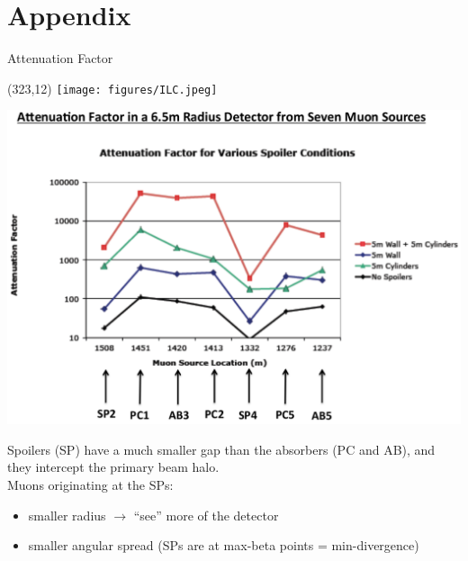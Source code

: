 \documentclass[xcolor={dvipsnames}]{beamer}
\newcommand{\ilclogo}{
  \setlength{\TPHorizModule}{1pt}
  \setlength{\TPVertModule}{1pt}
  \begin{textblock}{1}(323,12)
   \texttt{[image: figures/ILC.jpeg]}
  \end{textblock}
}
\begin{document}
\section*{Appendix}
\begin{frame}{Attenuation Factor}
\ilclogo
\begin{center}
\includegraphics[height=0.5\textheight]{Attenuation_Factors.pdf}
\end{center}
Spoilers (SP) have a much smaller gap than the absorbers (PC and AB), and they intercept the primary beam halo.\\
Muons originating at the SPs:
\begin{itemize}
 \item smaller radius $\rightarrow$ ``see'' more of the detector
 \item smaller angular spread (SPs are at max-beta points = min-divergence)
\end{itemize} 
\end{frame}
\end{document}
